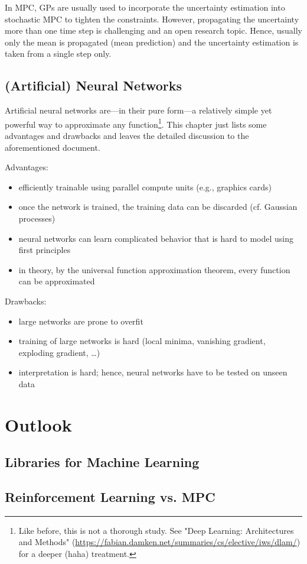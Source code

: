 			In MPC, GPs are usually used to incorporate the uncertainty estimation into stochastic MPC to tighten the constraints. However, propagating the uncertainty more than one time step is challenging and an open research topic. Hence, usually only the mean is propagated (mean prediction) and the uncertainty estimation is taken from a single step only.

	\section{(Artificial) Neural Networks}
		Artificial neural networks are---in their pure form---a relatively simple yet powerful way to approximate any function\footnote{Like before, this is not a thorough study. See "Deep Learning: Architectures and Methods" (\url{https://fabian.damken.net/summaries/cs/elective/iws/dlam/}) for a deeper (haha) treatment.}. This chapter just lists some advantages and drawbacks and leaves the detailed discussion to the aforementioned document.

		Advantages:
		\begin{itemize}
			\item efficiently trainable using parallel compute units (e.g., graphics cards)
			\item once the network is trained, the training data can be discarded (cf. Gaussian processes)
			\item neural networks can learn complicated behavior that is hard to model using first principles
			\item in theory, by the universal function approximation theorem, every function can be approximated
		\end{itemize}
		Drawbacks:
		\begin{itemize}
			\item large networks are prone to overfit
			\item training of large networks is hard (local minima, vanishing gradient, exploding gradient, \dots)
			\item interpretation is hard; hence, neural networks have to be tested on unseen data
		\end{itemize}

\chapter{Outlook} %

	\section{Libraries for Machine Learning} %

	\section{Reinforcement Learning vs. MPC} %
